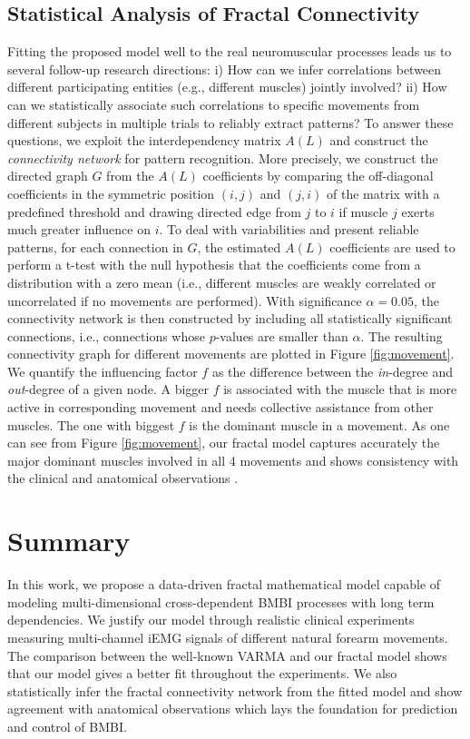 \subsection{Statistical Analysis of Fractal Connectivity}
Fitting the proposed model well to the real neuromuscular processes leads us to several follow-up research directions: i) How can we infer correlations between different participating entities (e.g., different muscles) jointly involved? ii) How can we statistically associate such correlations to specific movements from different subjects in multiple trials to reliably extract patterns? To answer these questions, we exploit the interdependency matrix $A(L)$ and construct the \textit{connectivity network} for pattern recognition. More precisely, we construct the directed graph $G$ from the $A(L)$ coefficients by comparing the off-diagonal coefficients in the symmetric position $(i,j)$ and $(j,i)$ of the matrix with a predefined threshold and drawing directed edge from $j$ to $i$ if muscle $j$ exerts much greater influence on $i$. To deal with variabilities and present reliable patterns, for each connection in $G$, the estimated $A(L)$ coefficients are used to perform a t-test with the null hypothesis that the coefficients come from a distribution with a zero mean (i.e., different muscles are weakly correlated or uncorrelated if no movements are performed). With significance $\alpha=0.05$, the connectivity network is then constructed by including all statistically significant connections, i.e., connections whose $p$-values are smaller than $\alpha$. The resulting connectivity graph for different movements are plotted in Figure \ref{fig:movement}. We quantify the influencing factor $f$ as the difference between the \textit{in}-degree and \textit{out}-degree of a given node. A bigger $f$ is associated with the muscle that is more active in corresponding movement and needs collective assistance from other muscles. The one with biggest $f$ is the dominant muscle in a movement. As one can see from Figure \ref{fig:movement}, our fractal model captures accurately the major dominant muscles involved in all 4 movements and shows consistency with the clinical and anatomical observations \cite{Henry} .
\vskip -7mm
\section{Summary}
In this work, we propose a data-driven fractal mathematical model capable of modeling multi-dimensional cross-dependent BMBI processes with long term dependencies. We justify our model through realistic clinical experiments measuring multi-channel iEMG signals of different natural forearm movements. The comparison between the well-known VARMA and our fractal model shows that our model gives a better fit throughout the experiments. We also statistically infer the fractal connectivity network from the fitted model and show agreement with anatomical observations which lays the foundation for prediction and control of BMBI.